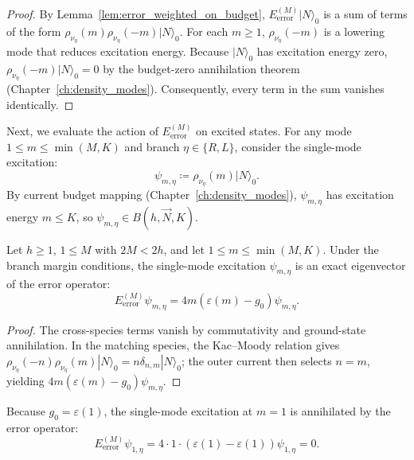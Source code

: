 \begin{proof}
By Lemma~\ref{lem:error_weighted_on_budget}, $E_{\mathrm{error}}^{(M)} |N\rangle_0$ is a sum of terms of the form $\rho_{\nu_\eta}(m) \rho_{\nu_\eta}(-m) |N\rangle_0$.
For each $m \ge 1$, $\rho_{\nu_\eta}(-m)$ is a lowering mode that reduces excitation energy. Because $|N\rangle_0$ has excitation energy zero, $\rho_{\nu_\eta}(-m) |N\rangle_0 = 0$ by the budget-zero annihilation theorem (Chapter~\ref{ch:density_modes}). Consequently, every term in the sum vanishes identically.
\end{proof}

Next, we evaluate the action of $E_{\mathrm{error}}^{(M)}$ on excited states. For any mode $1 \le m \le \min(M, K)$ and branch $\eta \in \{R, L\}$, consider the single-mode excitation:
\begin{equation}
\psi_{m, \eta} \coloneqq \rho_{\nu_\eta}(m) |N\rangle_0.
\end{equation}
By current budget mapping (Chapter~\ref{ch:density_modes}), $\psi_{m, \eta}$ has excitation energy $m \le K$, so $\psi_{m, \eta} \in B(h, \vec{N}, K)$.

\begin{theorem}
\label{thm:single_mode_error_eigenvector}
Let $h \ge 1$, $1 \le M$ with $2M < 2h$, and let $1 \le m \le \min(M, K)$. Under the branch margin conditions, the single-mode excitation $\psi_{m, \eta}$ is an exact eigenvector of the error operator:
\begin{equation}
E_{\mathrm{error}}^{(M)} \psi_{m, \eta} = 4 m \left( \varepsilon(m) - g_0 \right) \psi_{m, \eta}.
\end{equation}
\end{theorem}

\begin{proof}
The cross-species terms vanish by commutativity and ground-state annihilation. In the matching species, the Kac--Moody relation gives $\rho_{\nu_\eta}(-n)\rho_{\nu_\eta}(m)|N\rangle_0=n\delta_{n,m}|N\rangle_0$; the outer current then selects $n=m$, yielding $4m(\varepsilon(m)-g_0)\psi_{m,\eta}$.
\end{proof}

\begin{corollary}
\label{cor:first_mode_annihilation}
Because $g_0 = \varepsilon(1)$, the single-mode excitation at $m = 1$ is annihilated by the error operator:
\begin{equation}
E_{\mathrm{error}}^{(M)} \psi_{1, \eta} = 4 \cdot 1 \cdot (\varepsilon(1) - \varepsilon(1)) \psi_{1, \eta} = 0.
\end{equation}
\end{corollary}

